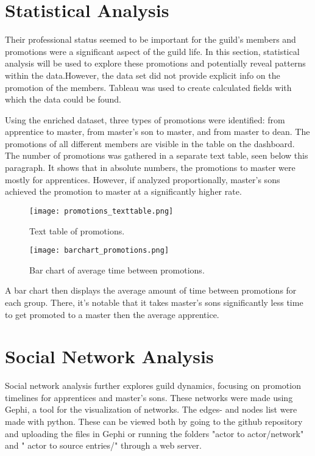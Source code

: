 \documentclass[12pt]{article}
\begin{document}
\section{Statistical Analysis}
Their professional status seemed to be important for the guild's members and promotions were a significant aspect of the guild life. In this section, statistical analysis will be used to explore these promotions and potentially reveal patterns within the data.However, the data set did not provide explicit info on the promotion of the members. Tableau was used to create calculated fields with which the data could be found.

 Using the enriched dataset, three types of promotions were identified: from apprentice to master, from master's son to master, and from master to dean. The promotions of all different members are visible in the table on the dashboard. The number of promotions was gathered in a separate text table, seen below this paragraph.  It shows that in absolute numbers, the promotions to master were mostly for apprentices. However, if analyzed proportionally, master's sons achieved the promotion to master at a significantly higher rate.
\begin{figure}[!htbp]
\center
\texttt{[image: promotions\_texttable.png]}
\caption{Text table of promotions.}
\label{fig:texttable_promotions}
\end{figure}
\begin{figure}[!htbp]
\center
\texttt{[image: barchart\_promotions.png]}
\caption{Bar chart of average time between promotions.}
\label{fig:barchart_promotions}
\end{figure}

A bar chart then displays the average amount of time between promotions for each group. There, it's notable that it takes master's sons significantly less time to get promoted to a master then the average apprentice.

 
\section{Social Network Analysis}
Social network analysis further explores guild dynamics, focusing on promotion timelines for apprentices and master's sons. These networks were made using Gephi, a tool for the visualization of networks. The edges- and nodes list were made with python. These can be viewed both by going to the github repository and uploading the files in Gephi or running the folders "actor to actor/network" and "  actor to source entries/" through a web server. 
\end{document}
